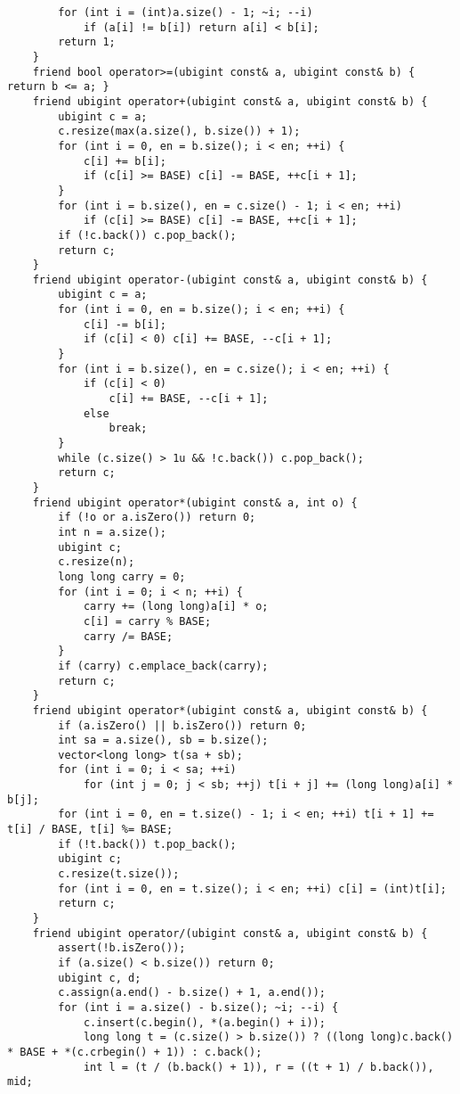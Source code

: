\begin{verbatim}
        for (int i = (int)a.size() - 1; ~i; --i)
            if (a[i] != b[i]) return a[i] < b[i];
        return 1;
    }
    friend bool operator>=(ubigint const& a, ubigint const& b) { return b <= a; }
    friend ubigint operator+(ubigint const& a, ubigint const& b) {
        ubigint c = a;
        c.resize(max(a.size(), b.size()) + 1);
        for (int i = 0, en = b.size(); i < en; ++i) {
            c[i] += b[i];
            if (c[i] >= BASE) c[i] -= BASE, ++c[i + 1];
        }
        for (int i = b.size(), en = c.size() - 1; i < en; ++i)
            if (c[i] >= BASE) c[i] -= BASE, ++c[i + 1];
        if (!c.back()) c.pop_back();
        return c;
    }
    friend ubigint operator-(ubigint const& a, ubigint const& b) {
        ubigint c = a;
        for (int i = 0, en = b.size(); i < en; ++i) {
            c[i] -= b[i];
            if (c[i] < 0) c[i] += BASE, --c[i + 1];
        }
        for (int i = b.size(), en = c.size(); i < en; ++i) {
            if (c[i] < 0)
                c[i] += BASE, --c[i + 1];
            else
                break;
        }
        while (c.size() > 1u && !c.back()) c.pop_back();
        return c;
    }
    friend ubigint operator*(ubigint const& a, int o) {
        if (!o or a.isZero()) return 0;
        int n = a.size();
        ubigint c;
        c.resize(n);
        long long carry = 0;
        for (int i = 0; i < n; ++i) {
            carry += (long long)a[i] * o;
            c[i] = carry % BASE;
            carry /= BASE;
        }
        if (carry) c.emplace_back(carry);
        return c;
    }
    friend ubigint operator*(ubigint const& a, ubigint const& b) {
        if (a.isZero() || b.isZero()) return 0;
        int sa = a.size(), sb = b.size();
        vector<long long> t(sa + sb);
        for (int i = 0; i < sa; ++i)
            for (int j = 0; j < sb; ++j) t[i + j] += (long long)a[i] * b[j];
        for (int i = 0, en = t.size() - 1; i < en; ++i) t[i + 1] += t[i] / BASE, t[i] %= BASE;
        if (!t.back()) t.pop_back();
        ubigint c;
        c.resize(t.size());
        for (int i = 0, en = t.size(); i < en; ++i) c[i] = (int)t[i];
        return c;
    }
    friend ubigint operator/(ubigint const& a, ubigint const& b) {
        assert(!b.isZero());
        if (a.size() < b.size()) return 0;
        ubigint c, d;
        c.assign(a.end() - b.size() + 1, a.end());
        for (int i = a.size() - b.size(); ~i; --i) {
            c.insert(c.begin(), *(a.begin() + i));
            long long t = (c.size() > b.size()) ? ((long long)c.back() * BASE + *(c.crbegin() + 1)) : c.back();
            int l = (t / (b.back() + 1)), r = ((t + 1) / b.back()), mid;

\end{verbatim}
